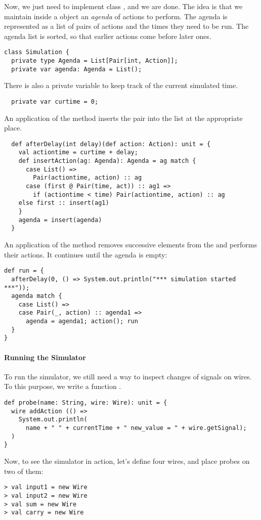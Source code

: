 {Now, we just need to implement class , and we are
done.  The idea is that we maintain inside a  object
an \emph{agenda} of actions to perform.  The agenda is represented as
a list of pairs of actions and the times they need to be run.  The
agenda list is sorted, so that earlier actions come before later ones.
\begin{lstlisting} 
class Simulation {
  private type Agenda = List[Pair[int, Action]];
  private var agenda: Agenda = List();
\end{lstlisting}
There is also a private variable  to keep track of the
current simulated time.
\begin{lstlisting}
  private var curtime = 0;
\end{lstlisting}
An application of the method  
inserts the pair  into the
 list at the appropriate place.
\begin{lstlisting}
  def afterDelay(int delay)(def action: Action): unit = {
    val actiontime = curtime + delay;
    def insertAction(ag: Agenda): Agenda = ag match {
      case List() => 
        Pair(actiontime, action) :: ag
      case (first @ Pair(time, act)) :: ag1 =>
        if (actiontime < time) Pair(actiontime, action) :: ag
	else first :: insert(ag1)
    }
    agenda = insert(agenda)
  }
\end{lstlisting}
An application of the  method removes successive elements
from the  and performs their actions.
It continues until the agenda is empty:
\begin{lstlisting}
def run = {
  afterDelay(0, () => System.out.println("*** simulation started ***"));
  agenda match {
    case List() =>
    case Pair(_, action) :: agenda1 =>
      agenda = agenda1; action(); run
  }
}
\end{lstlisting}


\paragraph{Running the Simulator}
To run the simulator, we still need a way to inspect changes of
signals on wires. To this purpose, we write a function .
\begin{lstlisting}
def probe(name: String, wire: Wire): unit = {
  wire addAction (() =>
    System.out.println(
      name + " " + currentTime + " new_value = " + wire.getSignal);
  )
}
\end{lstlisting}
Now, to see the simulator in action, let's define four wires, and place
probes on two of them: 
\begin{lstlisting}
> val input1 = new Wire
> val input2 = new Wire
> val sum = new Wire
> val carry = new Wire


\end{lstlisting}}
